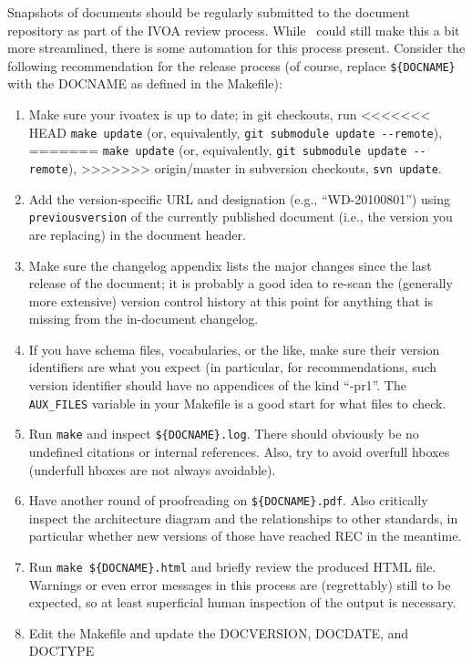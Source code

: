 \documentclass[11pt,a4paper]{ivoa}
\newcommand{\texword}[1]{\texttt{\color{texcolor} #1}}
\begin{document}
Snapshots of documents should be regularly submitted to the document
repository as part of the IVOA review process.  While \ivoatex~could
still make this a bit more streamlined, there is some automation for
this process present.  Consider the following recommendation for the
release process (of course, replace \verb|${DOCNAME}| with the DOCNAME
as defined in the Makefile):

\begin{enumerate}
\item Make sure your ivoatex is up to date; in git checkouts, run
<<<<<<< HEAD
\verb|make update| (or, equivalently, \verb|git submodule update --remote|), 
=======
\verb|make update| (or, equivalently, 
\verb|git submodule update --remote|), 
>>>>>>> origin/master
in subversion checkouts, \verb|svn update|.
\item Add the version-specific URL and designation (e.g.,
``WD-20100801'') using \texword{previousversion} of the currently
published document (i.e., the version you are replacing) in the document
header.
\item Make sure the changelog appendix lists the major changes since the
last release of the document; it is probably a good idea to re-scan the
(generally more extensive) version control history at this point for
anything that is missing from the in-document changelog.
\item If you have schema files, vocabularies, or the like, make sure
their version identifiers are what you expect (in particular, for
recommendations, such version identifier should have no appendices
of the kind ``-pr1''.  The \verb|AUX_FILES| variable in your Makefile is
a good start for what files to check.
\item Run \verb|make| and inspect \verb|${DOCNAME}.log|.  There should
obviously be no undefined citations or internal references.  Also, try
to avoid overfull hboxes (underfull hboxes are not always avoidable).
\item Have another round of proofreading on \verb|${DOCNAME}.pdf|.  Also
critically inspect the architecture diagram and the relationships to
other standards, in particular whether new versions of those have
reached REC in the meantime.
\item Run \verb|make ${DOCNAME}.html| and briefly review the produced
HTML file.  Warnings or even error messages in this process are
(regrettably) still to be expected, so at least superficial human inspection 
of the output is necessary.
\item Edit the Makefile and update the DOCVERSION, DOCDATE, and DOCTYPE

\end{enumerate}
\end{document}
